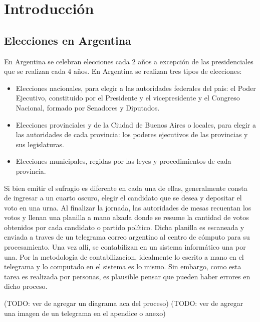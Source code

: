 \chapter{Introducci\'on}

\label{Chapter1}

\section{Elecciones en Argentina}

En Argentina se celebran elecciones cada 2 a\~{n}os a excepci\'on de las presidenciales que se realizan cada 4
a\~{n}os. En Argentina se realizan tres tipos de elecciones:

\begin{itemize}
    \item Elecciones nacionales, para elegir a las autoridades federales del país: el Poder Ejecutivo, constituido por el
          Presidente y el vicepresidente y el Congreso Nacional, formado por Senadores y Diputados.
    \item Elecciones provinciales y de la Ciudad de Buenos Aires o locales, para elegir a las autoridades de cada provincia: los
          poderes ejecutivos de las provincias y sus legislaturas.
    \item Elecciones municipales, regidas por las leyes y procedimientos de cada provincia.
\end{itemize}

Si bien emitir el sufragio es diferente en cada una de ellas, generalmente consta de ingresar a un cuarto oscuro,
elegir el candidato que se desea y depositar el voto en una urna. Al finalizar la jornada, las autoridades de mesas
recuentan los votos y llenan una planilla a mano alzada donde se resume la cantidad de votos obtenidos por cada
candidato o partido pol\'itico. Dicha planilla es escaneada y enviada a traves de un telegrama correo argentino al
centro de c\'omputo para su procesamiento. Una vez all\'i, se contabilizan en un sistema inform\'atico una por una. Por
la metodolog\'ia de contabilizac\'ion, idealmente lo escrito a mano en el telegrama y lo computado en el sistema es lo
mismo. Sin embargo, como esta tarea es realizada por personas, es plausible pensar que pueden haber errores en dicho
proceso.

(TODO: ver de agregar un diagrama aca del proceso)
(TODO: ver de agregar una imagen de un telegrama en el apendice o anexo)

